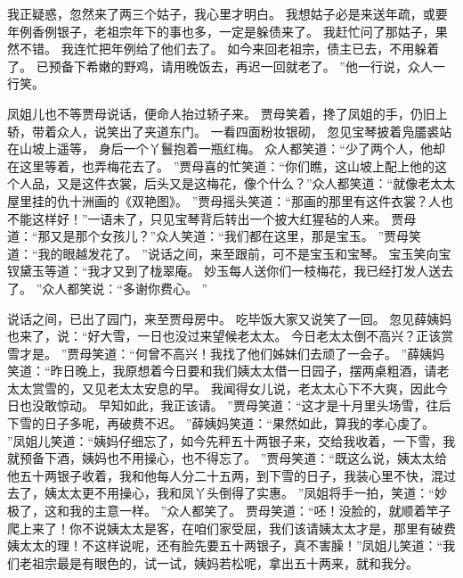 我正疑惑，忽然来了两三个姑子，我心里才明白。
我想姑子必是来送年疏，或要年例香例银子，老祖宗年下的事也多，一定是躲债来了。
我赶忙问了那姑子，果然不错。
我连忙把年例给了他们去了。
如今来回老祖宗，债主已去，不用躲着了。
已预备下希嫩的野鸡，请用晚饭去，再迟一回就老了。
”他一行说，众人一行笑。
\par
凤姐儿也不等贾母说话，便命人抬过轿子来。
贾母笑着，搀了凤姐的手，仍旧上轿，带着众人，说笑出了夹道东门。
一看四面粉妆银砌，
忽见宝琴披着凫靥裘站在山坡上遥等，
身后一个丫鬟抱着一瓶红梅。
众人都笑道：“少了两个人，他却在这里等着，也弄梅花去了。
”贾母喜的忙笑道：“你们瞧，这山坡上配上他的这个人品，又是这件衣裳，后头又是这梅花，像个什么？”众人都笑道：“就像老太太屋里挂的仇十洲画的《双艳图》。
”贾母摇头笑道：“那画的那里有这件衣裳？人也不能这样好！”一语未了，只见宝琴背后转出一个披大红猩毡的人来。
贾母道：“那又是那个女孩儿？”众人笑道：“我们都在这里，那是宝玉。
”贾母笑道：“我的眼越发花了。
”说话之间，来至跟前，可不是宝玉和宝琴。
宝玉笑向宝钗黛玉等道：“我才又到了栊翠庵。
妙玉每人送你们一枝梅花，我已经打发人送去了。
”众人都笑说：“多谢你费心。
”\par
{}
说话之间，已出了园门，来至贾母房中。
吃毕饭大家又说笑了一回。
忽见薛姨妈也来了，说：“好大雪，一日也没过来望候老太太。
今日老太太倒不高兴？正该赏雪才是。
”贾母笑道：“何曾不高兴！我找了他们姊妹们去顽了一会子。
”薛姨妈笑道：“昨日晚上，我原想着今日要和我们姨太太借一日园子，摆两桌粗酒，请老太太赏雪的，又见老太太安息的早。
我闻得女儿说，老太太心下不大爽，因此今日也没敢惊动。
早知如此，我正该请。
”贾母笑道：“这才是十月里头场雪，往后下雪的日子多呢，再破费不迟。
”薛姨妈笑道：“果然如此，算我的孝心虔了。
”凤姐儿笑道：“姨妈仔细忘了，如今先秤五十两银子来，交给我收着，一下雪，我就预备下酒，姨妈也不用操心，也不得忘了。
”贾母笑道：“既这么说，姨太太给他五十两银子收着，我和他每人分二十五两，到下雪的日子，我装心里不快，混过去了，姨太太更不用操心，我和凤丫头倒得了实惠。
”凤姐将手一拍，笑道：“妙极了，这和我的主意一样。
”众人都笑了。
贾母笑道：“呸！没脸的，就顺着竿子爬上来了！你不说姨太太是客，在咱们家受屈，我们该请姨太太才是，那里有破费姨太太的理！不这样说呢，还有脸先要五十两银子，真不害臊！”凤姐儿笑道：“我们老祖宗最是有眼色的，试一试，姨妈若松呢，拿出五十两来，就和我分。
